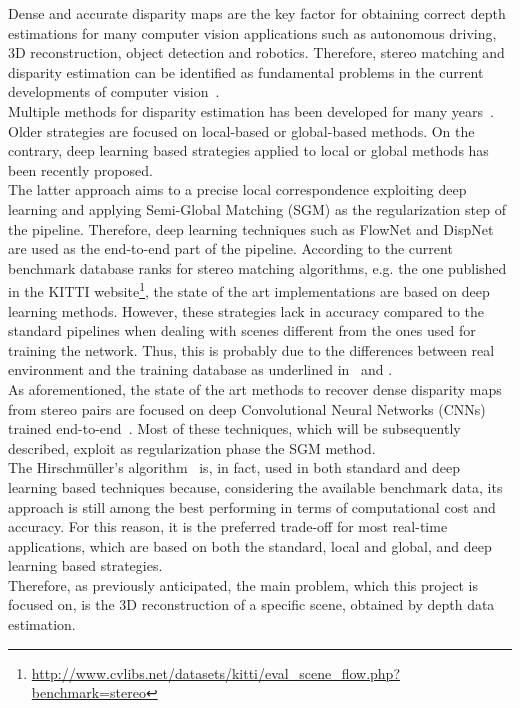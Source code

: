 Dense and accurate disparity maps are the key factor for obtaining correct depth estimations for many computer vision applications such as autonomous driving, 3D reconstruction, object detection and robotics.  
Therefore, stereo matching and disparity estimation can be identified as fundamental problems in the current developments of computer vision~\cite{Seki2017}.\\
Multiple methods for disparity estimation has been developed for many years~\cite{Scharstein2001}. 
Older strategies are focused on local-based or global-based methods. 
On the contrary, deep learning based strategies applied to local or global methods has been recently proposed. \\
The latter approach aims to a precise local correspondence exploiting deep learning and applying Semi-Global Matching (SGM) as the regularization step of the pipeline. 
Therefore, deep learning techniques such as FlowNet and DispNet~\cite{Seki2017} are used as the end-to-end part of the pipeline.
According to the current benchmark database ranks for stereo matching algorithms, e.g. the one published in the KITTI website\footnote{\url{http://www.cvlibs.net/datasets/kitti/eval_scene_flow.php?benchmark=stereo}}, the state of the art implementations are based on deep learning methods. 
However, these strategies lack in accuracy compared to the standard pipelines when dealing with scenes different from the ones used for training the network. 
Thus, this is probably due to the differences between real environment and the training database as underlined in~\cite{Seki2017} and \cite{Poggi2019}.\\
As aforementioned, the state of the art methods to recover dense disparity maps from stereo pairs are focused on deep Convolutional Neural Networks (CNNs) trained end-to-end~\cite{Tonioni2020}. 
Most of these techniques, which will be subsequently described, exploit as regularization phase the SGM method.\\
The Hirschm\"{u}ller's algorithm~\cite{Hirschmuller2008} is, in fact, used in both standard and deep learning based techniques because, considering the available benchmark data, its approach is still among the best performing in terms of computational cost and accuracy. 
For this reason, it is the preferred trade-off for most real-time applications, which are based on both the standard, local and global, and deep learning based strategies.\\
Therefore, as previously anticipated, the main problem, which this project is focused on, is the 3D reconstruction of a specific scene, obtained by depth data estimation.
